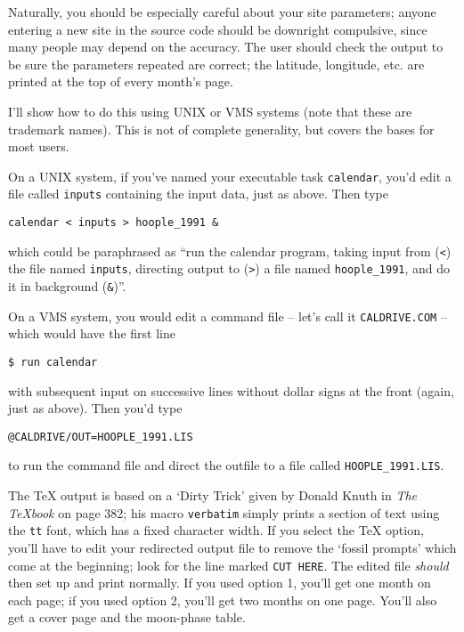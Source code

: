 Naturally, you should be especially careful about your site parameters;
anyone entering a new site in the source code should be downright
compulsive, since many people may depend on the accuracy.  The user
should check the  output to be sure the parameters repeated are correct; 
the latitude, longitude, etc. are printed at the top of every month's page.


I'll show how to do this using UNIX or VMS systems (note that these
are trademark names).
This is not of complete generality, but covers the bases for most
users.

On a UNIX system, if you've named your executable task {\tt calendar},
you'd edit a file called {\tt inputs} containing the input data,
just as above.  Then type 
\par

{\tt \qquad calendar < inputs > hoople\_1991 \&}

\par
which could be paraphrased as ``run the calendar program, taking 
input from ({\tt <}) the file named {\tt inputs}, 
directing output to ({\tt >}) a 
file named {\tt hoople\_1991}, and do it in background ({\tt \&})''. 

On a VMS system, you would edit a command file -- let's call
it {\tt CALDRIVE.COM} -- which would have the first line
\par
{\tt \qquad \$ run calendar}
\par
with subsequent input on successive lines without dollar signs at the
front (again, just as above).  Then you'd type 
\par
{\tt \qquad @CALDRIVE/OUT=HOOPLE\_1991.LIS}
\par
to run the command file and direct the outfile to a file called 
{\tt HOOPLE\_1991.LIS}.


The TeX output is based on a `Dirty Trick' given by Donald Knuth in
{\it The TeXbook} on page 382; his macro {\tt verbatim} 
simply prints a section of text using the {\tt tt} font, which has
a fixed character width.  If you select the TeX option, 
you'll have to edit your redirected output file to
remove the `fossil prompts' which come at the beginning;
look for the line marked {\tt CUT HERE}.  The edited file
{\it should} then set up and print normally.  If you
used option 1, you'll get one month on
each page; if you used option 2, you'll get two months on 
one page.  You'll also get a cover page and the moon-phase table.  

